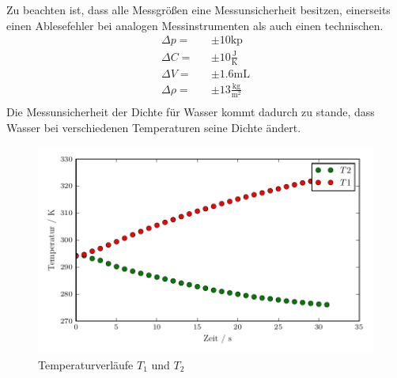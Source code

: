 Zu beachten ist, dass alle Messgrößen eine Messunsicherheit besitzen, einerseits einen Ablesefehler bei analogen Messinstrumenten als auch einen technischen.
\begin{eqnarray*}
  \Delta p =& &\pm 10 \text{kp}				\\
  \Delta C =& &\pm 10 \frac{\text{J}}{\text{K}}		\\
  \Delta V =& &\pm 1.6 \text{mL}				\\
  \Delta \rho =& &\pm 13 \frac{\text{kg}}{\text{m$^2$}}	\\
\end{eqnarray*}
Die Messunsicherheit der Dichte für Wasser kommt dadurch zu stande, dass Wasser bei verschiedenen Temperaturen seine Dichte ändert.
\begin{figure}
  \centering
  \includegraphics[width=\textwidth]{TVerlauf.pdf}
  \caption{Temperaturverläufe $T_\text{1}$ und $T_\text{2}$}
  \label{fig:T1&T2}
\end{figure}

